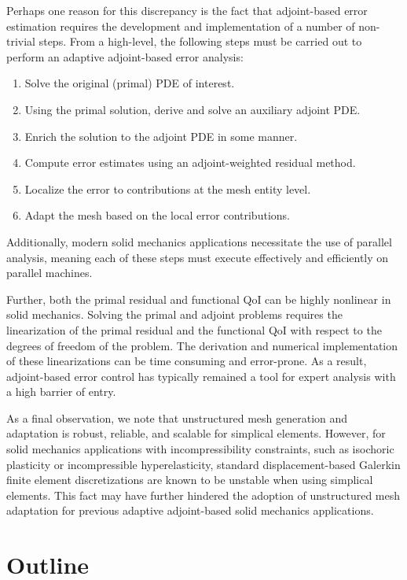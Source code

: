 Perhaps one reason for this discrepancy is the fact that adjoint-based error
estimation requires the development and implementation of a number of
non-trivial steps. From a high-level, the following steps must be carried out
to perform an adaptive adjoint-based error analysis:
%
\begin{enumerate}
\item Solve the original (primal) PDE of interest.
\item Using the primal solution, derive and solve an auxiliary adjoint PDE.
\item Enrich the solution to the adjoint PDE in some manner.
\item Compute error estimates using an adjoint-weighted residual method.
\item Localize the error to contributions at the mesh entity level.
\item Adapt the mesh based on the local error contributions.
\end{enumerate}
%
Additionally, modern solid mechanics applications necessitate the use of parallel
analysis, meaning each of these steps must execute effectively and
efficiently on parallel machines.

Further, both the primal residual and functional QoI can be highly nonlinear
in solid mechanics. Solving the primal and adjoint problems
requires the linearization of the primal residual and the functional QoI
with respect to the degrees of freedom of the problem. The derivation and
numerical implementation of these linearizations can be time consuming and
error-prone. As a result, adjoint-based error control has typically remained
a tool for expert analysis with a high barrier of entry.

As a final observation, we note that unstructured mesh generation and
adaptation is robust, reliable, and scalable for simplical elements. However,
for solid mechanics applications with incompressibility constraints, such as
isochoric plasticity or incompressible hyperelasticity, standard
displacement-based Galerkin finite element discretizations are known to be
unstable when using simplical elements. This fact may have further hindered
the adoption of unstructured mesh adaptation for previous adaptive
adjoint-based solid mechanics applications.

\section{Outline}

